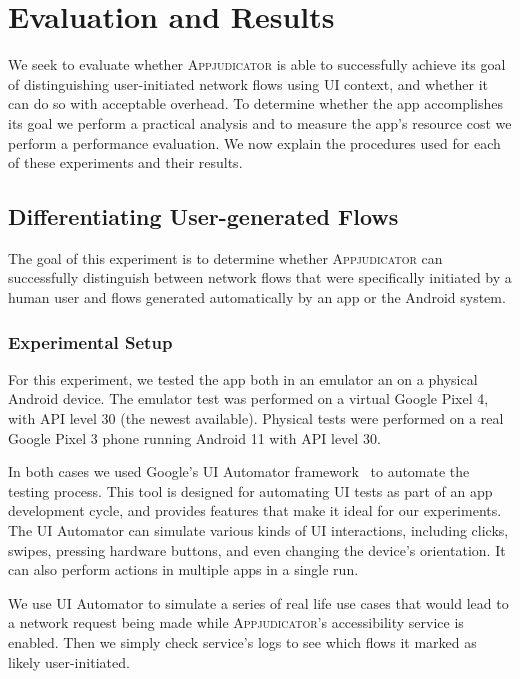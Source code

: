 \section{Evaluation and Results}
\label{sec:evaluation-and-results}

We seek to evaluate whether \textsc{Appjudicator} is able to successfully
achieve its goal of distinguishing user-initiated network flows using UI
context, and whether it can do so with acceptable overhead. To determine whether
the app accomplishes its goal we perform a practical analysis and to measure the
app's resource cost we perform a performance evaluation. We now explain the
procedures used for each of these experiments and their results.

\subsection{Differentiating User-generated Flows}
\label{sec:differentiating-user-generated-flows}

The goal of this experiment is to determine whether \textsc{Appjudicator} can
successfully distinguish between network flows that were specifically initiated
by a human user and flows generated automatically by an app or the Android
system.

\subsubsection{Experimental Setup}
\label{sec:experimental-setup}

For this experiment, we tested the app both in an emulator an on a physical
Android device. The emulator test was performed on a virtual Google Pixel 4,
with API level 30 (the newest available). Physical tests were performed on a
real Google Pixel 3 phone running Android 11 with API level 30.

In both cases we used Google's UI Automator framework~\cite{uiautomator2020} to
automate the testing process. This tool is designed for automating UI tests as
part of an app development cycle, and provides features that make it ideal for
our experiments. The UI Automator can simulate various kinds of UI interactions,
including clicks, swipes, pressing hardware buttons, and even changing the
device's orientation. It can also perform actions in multiple apps in a single
run.

We use UI Automator to simulate a series of real life use cases that would lead
to a network request being made while \textsc{Appjudicator}'s accessibility
service is enabled. Then we simply check service's logs to see which flows it
marked as likely user-initiated.

